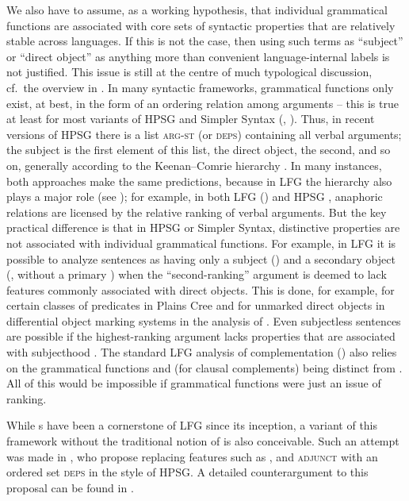 \documentclass[output=paper]{../langscibook}
\begin{document}
 We also have to assume, as a working hypothesis, that individual grammatical functions are associated with core sets of syntactic properties that are relatively stable across languages. If this is not the case, then using such terms as ``subject'' or ``direct object'' as anything more than convenient language-internal labels is not justified. This issue is still at the centre of much typological discussion, cf.\ the overview in \citet{bickel2010-gramrel}. In many syntactic frameworks, grammatical functions only exist, at best, in the form of an ordering relation among arguments -- this is true at least for most variants of HPSG \citep{pollard1994head-driven,mue:etal:21:ed} and Simpler Syntax (\citealt{culicover2005simpler}, ). Thus, in recent versions of HPSG there is a list \textsc{arg-st} (or \textsc{deps}) containing all verbal arguments; the subject is the first element of this list, the direct object, the second, and so on, generally according to the Keenan--Comrie hierarchy \citep{keenan1977noun}. In many instances, both approaches make the same predictions, because in LFG the \GF hierarchy also plays a major role (see ); for example, in both LFG () and HPSG \citep{mul:bra:20}, anaphoric relations are licensed by the relative ranking of verbal arguments. But the key practical difference is that in HPSG or Simpler Syntax, distinctive properties are not associated with individual grammatical functions. For example, in LFG it is possible to analyze sentences as having only a subject (\SUBJ) and a secondary object ({\OBJTHETA}, without a primary \OBJ) when the ``second-ranking'' argument is deemed to lack features commonly associated with direct objects. This is done, for example, for certain classes of predicates in Plains Cree \citep{dahlstrom2009} and for unmarked direct objects in differential object marking systems in the analysis of \citet{DN}. Even subjectless sentences are possible if the highest-ranking argument lacks properties that are associated with subjecthood \citep{Kibort2006}. The standard LFG analysis of complementation () also relies on the grammatical functions \COMP and \XCOMP (for clausal complements) being distinct from \OBJ \citep{DL00,AMM05}.  All of this would be impossible if grammatical functions were just an issue of ranking.
 
 While {\GF}s have been a cornerstone of LFG since its inception, a variant of this framework without the traditional notion of \GF is also conceivable. Such an attempt was made in \citet{patejuk2016reducing}, who propose replacing features such as \SUBJ, \OBJ and \textsc{adjunct} with an ordered set \textsc{deps} in the style of HPSG. A detailed counterargument to this proposal can be found in \citet{kapl:17}.
 
\end{document}
